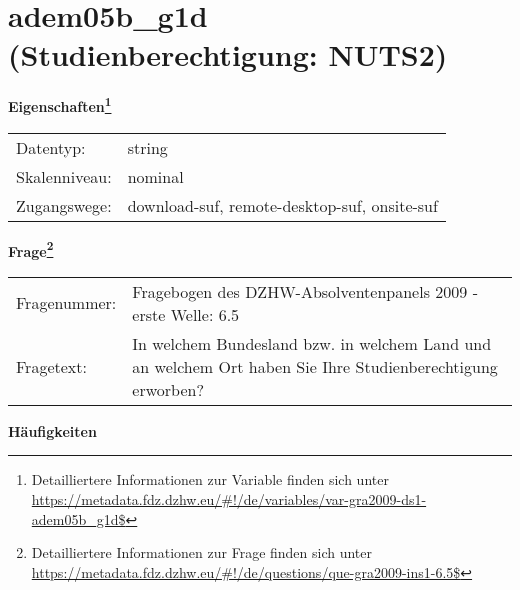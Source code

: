 
    \setcounter{footnote}{0}

    \vspace*{-1.8cm}
	\section{adem05b\_g1d (Studienberechtigung: NUTS2)}
	\label{section:adem05b_g1d}



    \vspace*{0.5cm}
    \noindent\textbf{Eigenschaften\footnote{Detailliertere Informationen zur Variable finden sich unter
		\url{https://metadata.fdz.dzhw.eu/\#!/de/variables/var-gra2009-ds1-adem05b_g1d$}}}\\
	\begin{tabularx}{\hsize}{@{}lX}
	Datentyp: & string \\
	Skalenniveau: & nominal \\
	Zugangswege: &
	  download-suf, 
	  remote-desktop-suf, 
	  onsite-suf
 \\
    \end{tabularx}



				\vspace*{0.5cm}
                \noindent\textbf{Frage\footnote{Detailliertere Informationen zur Frage finden sich unter
		              \url{https://metadata.fdz.dzhw.eu/\#!/de/questions/que-gra2009-ins1-6.5$}}}\\
				\begin{tabularx}{\hsize}{@{}lX}
					Fragenummer: &
					  Fragebogen des DZHW-Absolventenpanels 2009 - erste Welle:
					  6.5
 \\
					Fragetext: & In welchem Bundesland bzw. in welchem Land und an welchem Ort haben Sie Ihre Studienberechtigung erworben? \\
				\end{tabularx}





        		\vspace*{0.5cm}
                \noindent\textbf{Häufigkeiten}

